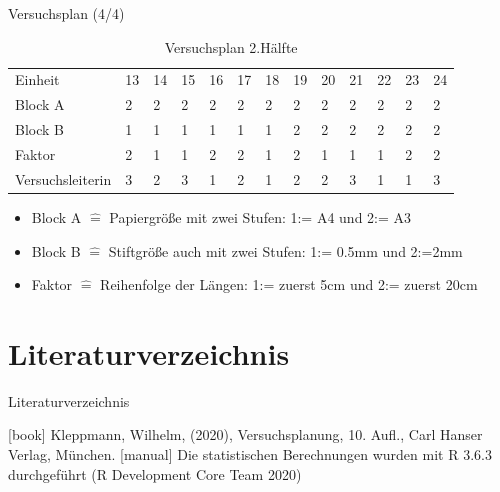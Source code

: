 \documentclass[ ngerman, fontsize= 10pt, headings=big, titlepage=true, xcolor=dvipsnames]{beamer}
\begin{document}
\begin{frame}{Versuchsplan (4/4)}
	
{\small
\begin{table}[hb]
	\caption{Versuchsplan 2.Hälfte}
	\centering
	\begin{tabular}[b]{l||l|l|l|l|l|l|l|l|l|l|l|l}
		\hline
		Einheit & 13 & 14 & 15 & 16 & 17 & 18 & 19 & 20 & 21 & 22 & 23 & 24\\
		\hhline{=============}
		Block A & 2 & 2 & 2 & 2 & 2 & 2 & 2 & 2 & 2 & 2 & 2 & 2\\
		\hline
		Block B & 1 & 1 & 1 & 1 & 1 & 1 & 2 & 2 & 2 & 2 & 2 & 2\\
		\hline
		Faktor & 2 & 1 & 1 & 2 & 2 & 1 & 2 & 1 & 1 & 1 & 2 & 2\\
		\hhline{=============}
		{\tiny Versuchsleiterin} & 3 & 2 & 3 & 1 & 2 & 1 & 2 & 2 & 3 & 1 & 1 & 3\\
		\hline
	\end{tabular}
\end{table}}

\begin{itemize}
	\item Block A $\hat{=}$ Papiergröße mit zwei Stufen: 1:= A4 und 2:= A3  
	\item Block B $\hat{=}$ Stiftgröße auch mit zwei Stufen:  1:= 0.5mm und 2:=2mm 
	\item Faktor $\hat{=}$ Reihenfolge der Längen: 1:= zuerst 5cm und 2:= zuerst 20cm
\end{itemize}

\end{frame}



\section{Literaturverzeichnis}
\begin{frame}{Literaturverzeichnis}
\begin{thebibliography}{Kleppmann}
[book]
 Kleppmann, Wilhelm, (2020),
 \newblock Versuchsplanung, 10. Aufl., 
\newblock Carl Hanser Verlag,
München.
[manual]
Die statistischen
Berechnungen wurden mit R 3.6.3 durchgeführt
\newblock (R Development Core Team 2020) 
 \end{thebibliography}
\end{frame}
\end{document}
